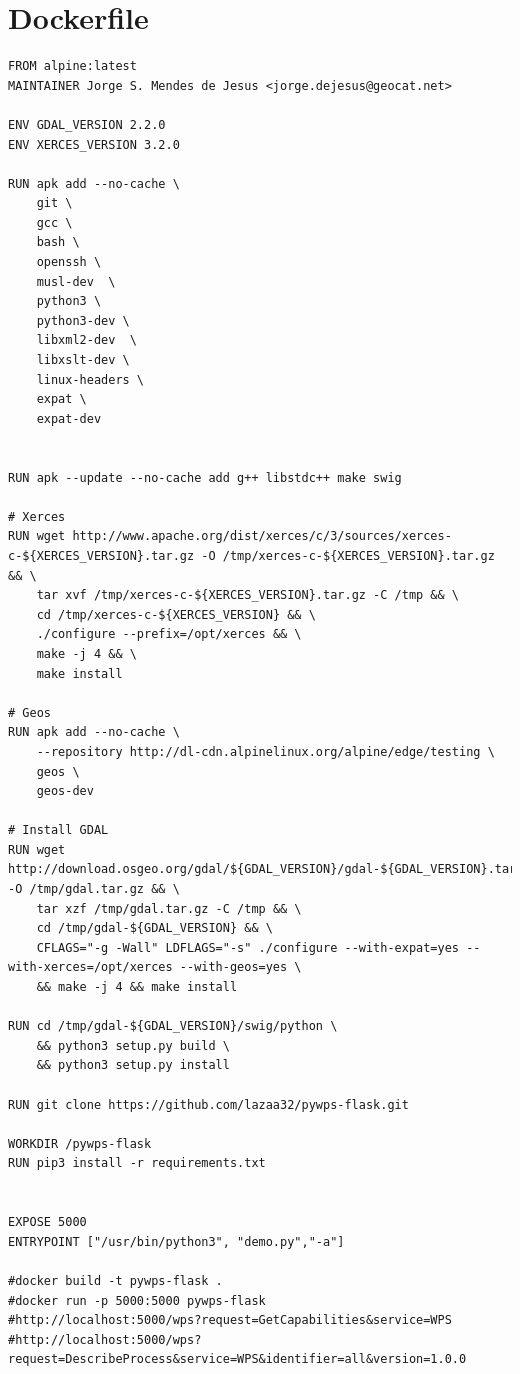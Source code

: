 \documentclass[12pt,a4paper]{article}
\begin{document}
\newpage
\section{Dockerfile}
\label{app:dockerfile}
\begin{lstlisting}[basicstyle=\small,caption={Dockerfile example}]
FROM alpine:latest
MAINTAINER Jorge S. Mendes de Jesus <jorge.dejesus@geocat.net>

ENV GDAL_VERSION 2.2.0
ENV XERCES_VERSION 3.2.0

RUN apk add --no-cache \
	git \
	gcc \
	bash \
	openssh \
	musl-dev  \
	python3 \
	python3-dev \
	libxml2-dev  \
	libxslt-dev \
	linux-headers \
	expat \
	expat-dev


RUN apk --update --no-cache add g++ libstdc++ make swig

# Xerces
RUN wget http://www.apache.org/dist/xerces/c/3/sources/xerces-c-${XERCES_VERSION}.tar.gz -O /tmp/xerces-c-${XERCES_VERSION}.tar.gz && \
    tar xvf /tmp/xerces-c-${XERCES_VERSION}.tar.gz -C /tmp && \
    cd /tmp/xerces-c-${XERCES_VERSION} && \
    ./configure --prefix=/opt/xerces && \
    make -j 4 && \
    make install

# Geos
RUN apk add --no-cache \
    --repository http://dl-cdn.alpinelinux.org/alpine/edge/testing \
    geos \
    geos-dev

# Install GDAL
RUN wget http://download.osgeo.org/gdal/${GDAL_VERSION}/gdal-${GDAL_VERSION}.tar.gz -O /tmp/gdal.tar.gz && \
	tar xzf /tmp/gdal.tar.gz -C /tmp && \
	cd /tmp/gdal-${GDAL_VERSION} && \
	CFLAGS="-g -Wall" LDFLAGS="-s" ./configure --with-expat=yes --with-xerces=/opt/xerces --with-geos=yes \
	&& make -j 4 && make install

RUN cd /tmp/gdal-${GDAL_VERSION}/swig/python \
	&& python3 setup.py build \
	&& python3 setup.py install

RUN git clone https://github.com/lazaa32/pywps-flask.git

WORKDIR /pywps-flask
RUN pip3 install -r requirements.txt


EXPOSE 5000
ENTRYPOINT ["/usr/bin/python3", "demo.py","-a"]

#docker build -t pywps-flask .
#docker run -p 5000:5000 pywps-flask
#http://localhost:5000/wps?request=GetCapabilities&service=WPS
#http://localhost:5000/wps?request=DescribeProcess&service=WPS&identifier=all&version=1.0.0
\end{lstlisting}

\newpage
\end{document}
